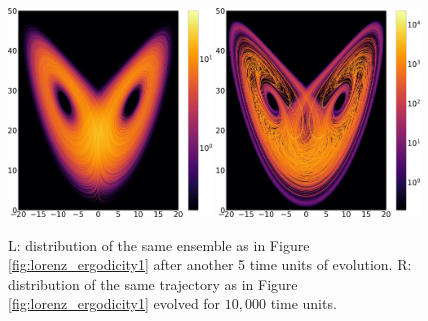 \begin{figure} \centering
\includegraphics[width=0.48\textwidth]{lorenz_trajectory_10000.0.png}
\hspace{0.02\textwidth}
\includegraphics[width=0.48\textwidth]{lorenz_ensemble_15.png}
\caption{
L: distribution of the same ensemble as in Figure \ref{fig:lorenz_ergodicity1}
after another 5 time units of evolution.
R: distribution of the same trajectory as in Figure \ref{fig:lorenz_ergodicity1}
evolved for $10,000$ time units.
}
\label{fig:lorenz_ergodicity2}
\end{figure}
